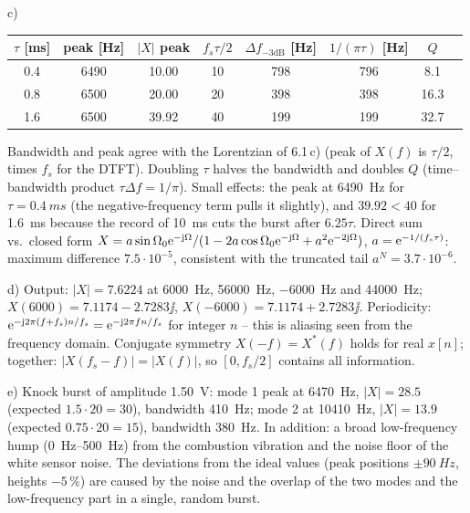 \begin{solution}
c) 
\begin{center}\small
\begin{tabular}{@{}cccccccc@{}}\toprule
$\tau$ [ms] & peak [Hz] & $|X|$ peak & $f_s\tau/2$ & $\Delta f_{-3\mathrm{dB}}$ [Hz] & $1/(\pi\tau)$ [Hz] & $Q$\\\midrule
0.4 & 6490 & 10.00 & 10 & 798 & 796 & 8.1\\
0.8 & 6500 & 20.00 & 20 & 398 & 398 & 16.3\\
1.6 & 6500 & 39.92 & 40 & 199 & 199 & 32.7\\\bottomrule
\end{tabular}
\end{center}
Bandwidth and peak agree with the Lorentzian of 6.1\,c) (peak of $X(f)$ is
$\tau/2$, times $f_s$ for the DTFT). Doubling $\tau$ halves the bandwidth and
doubles $Q$ (time--bandwidth product $\tau\Delta f=1/\pi$). Small effects: the
peak at \SI{6490}{Hz} for $\tau=\SI{0.4}{ms}$ (the negative-frequency term
pulls it slightly), and $39.92<40$ for \SI{1.6}{ms} because the record of
\SI{10}{ms} cuts the burst after $6.25\tau$. Direct sum vs.\ closed form
$X=a\sin\Omega_0\mathrm{e}^{-\mathrm{j}\Omega}/(1-2a\cos\Omega_0\mathrm{e}^{-\mathrm{j}\Omega}+a^2\mathrm{e}^{-2\mathrm{j}\Omega})$,
$a=\mathrm{e}^{-1/(f_s\tau)}$: maximum difference $7.5\cdot10^{-5}$, consistent with
the truncated tail $a^N=3.7\cdot10^{-6}$.

d) Output: $|X|=7.6224$ at \SI{6000}{Hz}, \SI{56000}{Hz}, \SI{-6000}{Hz} and
\SI{44000}{Hz}; $X(6000)=7.1174-2.7283\jj$, $X(-6000)=7.1174+2.7283\jj$.
Periodicity: $\mathrm{e}^{-\mathrm{j}2\pi(f+f_s)n/f_s}=\mathrm{e}^{-\mathrm{j}2\pi fn/f_s}$ for integer $n$ --
this is aliasing seen from the frequency domain. Conjugate symmetry
$X(-f)=X^*(f)$ holds for real $x[n]$; together: $|X(f_s-f)|=|X(f)|$, so
$[0,f_s/2]$ contains all information.

e) Knock burst of amplitude \SI{1.50}{V}: mode 1 peak at \SI{6470}{Hz},
$|X|=28.5$ (expected $1.5\cdot20=30$), bandwidth \SI{410}{Hz}; mode 2 at
\SI{10410}{Hz}, $|X|=13.9$ (expected $0.75\cdot20=15$), bandwidth \SI{380}{Hz}.
In addition: a broad low-frequency hump (\SIrange{0}{500}{Hz}) from the
combustion vibration and the noise floor of the white sensor noise. The
deviations from the ideal values (peak positions $\pm\SI{90}{Hz}$, heights
$-5\,\%$) are caused by the noise and the overlap of the two modes and the
low-frequency part in a single, random burst.
\end{solution}

